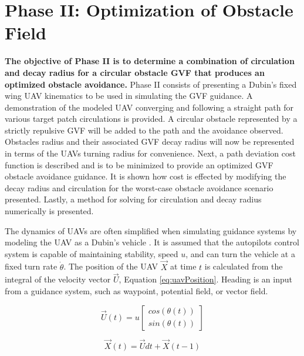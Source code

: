 \documentclass[numbered,pdftex]{ohio-etd}
\begin{document}
\pagebreak

\section{Phase II: Optimization of Obstacle Field}
\textbf{The objective of Phase II is to determine a combination of circulation and decay radius for a circular obstacle GVF that produces an optimized obstacle avoidance.} Phase II consists of presenting a Dubin's fixed wing UAV kinematics to be used in simulating the GVF guidance. 
A demonstration of the modeled UAV converging and following a straight path for various target patch circulations is provided. A circular obstacle represented by a strictly repulsive GVF will be added to the path and the avoidance observed. Obstacles radius and their associated GVF decay radius will now be represented in terms of the UAVs turning radius for convenience. Next, a path deviation cost function is described and is to be minimized to provide an optimized GVF obstacle avoidance guidance. It is shown how cost is effected by modifying the decay radius and circulation for the worst-case obstacle avoidance scenario presented. Lastly, a method for solving for circulation and decay radius numerically is presented. 


The dynamics of UAVs are often simplified when simulating guidance systems by modeling the UAV as a Dubin's vehicle \cite{frew_cooperative_2007,griffiths_vector_2006,nelson_cooperative_2005,nelson_vector_2006,nelson_vector_2007}. It is assumed that the autopilots control system is capable of maintaining stability, speed $u$, and can turn the vehicle at a fixed turn rate $\dot{\theta}$. The position of the UAV $\overrightarrow{X}$ at time $t$ is calculated from the integral of the velocity vector $\overrightarrow{U}$, Equation \ref{eq:uavPosition}. Heading is an input from a guidance system, such as waypoint, potential field, or vector field.

\begin{equation}
\label{eq:uavVelocity}
\overrightarrow{U}(t) = u \begin{bmatrix}
cos(\theta(t)) \\
sin(\theta(t))
\end{bmatrix}
\end{equation}


\begin{equation}
\label{eq:uavPosition}
\overrightarrow{X}(t) = \overrightarrow{U}dt + \overrightarrow{X}(t-1)
\end{equation}
\end{document}
